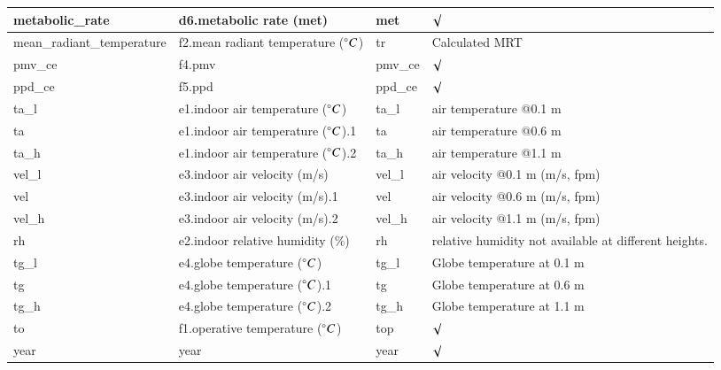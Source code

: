 \begin{table}[h!]
{\begin{tabular}{|l|l|l|l|}
      metabolic\_rate                & d6.metabolic rate (met)        & met                  & $\surd$ \\ \hline
      mean\_radiant\_temperature      & f2.mean radiant temperature ($\degree C$) & tr                 & Calculated MRT\\ \hline
      pmv\_ce                       & f4.pmv                         & pmv\_ce              & $\surd$ \\ \hline
      ppd\_ce                       & f5.ppd                         & ppd\_ce              & $\surd$ \\ \hline
      ta\_l                         & e1.indoor air temperature ($\degree C$)   & ta\_l                & air temperature @0.1 m \\ \hline
      ta                            & e1.indoor air temperature ($\degree C$).1 & ta                   & air temperature @0.6 m \\ \hline
      ta\_h                         & e1.indoor air temperature ($\degree C$).2 & ta\_h                & air temperature @1.1 m \\ \hline
      vel\_l                        & e3.indoor air velocity (m/s)    & vel\_l               & air velocity @0.1 m  (m/s, fpm) \\ \hline
      vel                           & e3.indoor air velocity (m/s).1  & vel                  & air velocity @0.6 m  (m/s, fpm) \\ \hline
      vel\_h                        & e3.indoor air velocity (m/s).2  & vel\_h               & air velocity @1.1 m  (m/s, fpm) \\ \hline
      rh                            & e2.indoor relative humidity (\%) & rh                 & relative humidity not available at different heights.\\ \hline
      tg\_l                        & e4.globe temperature ($\degree C$)        & tg\_l               & Globe temperature at 0.1 m \\ \hline
      tg                           & e4.globe temperature ($\degree C$).1      & tg                  & Globe temperature at 0.6 m \\ \hline
      tg\_h                        & e4.globe temperature ($\degree C$).2      & tg\_h               & Globe temperature at 1.1 m \\ \hline
      to                           & f1.operative temperature ($\degree C$)    & top                 & $\surd$ \\ \hline
      year                         & year                           & year                & $\surd$ \\ \hline

\end{tabular}}
\end{table}
